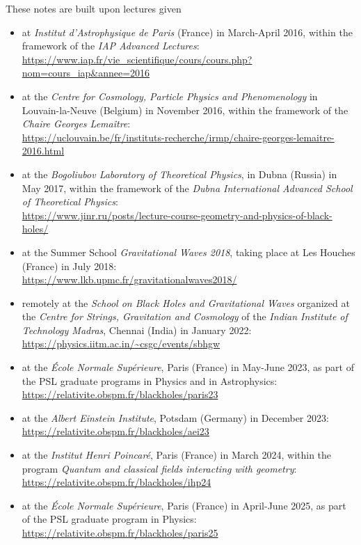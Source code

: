 These notes are built upon lectures given
\begin{itemize}
\item at \emph{Institut d'Astrophysique de Paris} (France) in March-April 2016, within the
framework of the \emph{IAP Advanced Lectures}:\\
{\footnotesize\url{https://www.iap.fr/vie_scientifique/cours/cours.php?nom=cours_iap&annee=2016}}
\item at the \emph{Centre for Cosmology, Particle Physics and Phenomenology} in Louvain-la-Neuve
(Belgium) in November 2016, within the framework of the \emph{Chaire Georges Lemaître}:\\
{\footnotesize \url{https://uclouvain.be/fr/instituts-recherche/irmp/chaire-georges-lemaitre-2016.html}}
\item at the
\emph{Bogoliubov Laboratory of Theoretical Physics}, in Dubna (Russia) in May 2017,
within the framework of the \emph{Dubna International Advanced School of Theoretical Physics}:\\
{\footnotesize\url{https://www.jinr.ru/posts/lecture-course-geometry-and-physics-of-black-holes/}}
\item at the Summer School \emph{Gravitational Waves 2018}, taking place at Les Houches
(France) in July 2018:\\
{\footnotesize\url{https://www.lkb.upmc.fr/gravitationalwaves2018/}}
\item remotely at the \emph{School on Black Holes and Gravitational Waves}
organized at the
\emph{Centre for Strings, Gravitation and Cosmology} of the
\emph{Indian Institute of Technology Madras}, Chennai (India) in January 2022:\\
{\footnotesize\url{https://physics.iitm.ac.in/~csgc/events/sbhgw}}
\item at the \emph{École Normale Supérieure}, Paris (France) in May-June 2023, as
part of the PSL graduate programs in Physics and in Astrophysics:\\
{\footnotesize\url{https://relativite.obspm.fr/blackholes/paris23}}
\item at the \emph{Albert Einstein Institute}, Potsdam (Germany) in December 2023:\\
{\footnotesize\url{https://relativite.obspm.fr/blackholes/aei23}}
\item at the \emph{Institut Henri Poincaré}, Paris (France) in March 2024, within the
program \emph{Quantum and classical fields interacting with geometry}:\\
{\footnotesize\url{https://relativite.obspm.fr/blackholes/ihp24}}
\item at the \emph{École Normale Supérieure}, Paris (France) in April-June 2025, as
part of the PSL graduate program in Physics:\\
{\footnotesize\url{https://relativite.obspm.fr/blackholes/paris25}}
\end{itemize}

